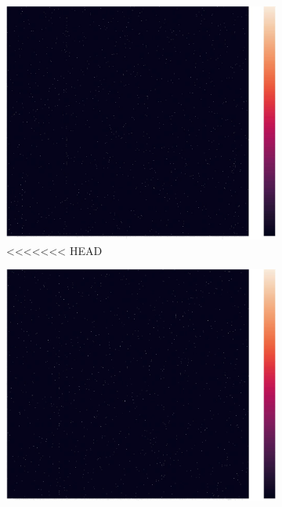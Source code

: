 \documentclass[12pt,%
               a4paper,%
               oneside,openany,%
               titlepage,%
               headinclude,footinclude,%
               BCOR5mm,%
               cleardoublepage=empty,%
               tablecaptionabove,%
               floatperchapter,
               ]{scrreprt}                 %
\begin{document}
\begin{figure}[ht]
\begin{minipage}[b]{0.5\linewidth}
\begin{figure}[ht]
\begin{minipage}[b]{0.5\linewidth}
    \centering
    \includegraphics[width=.9\linewidth]{Figures/Matrix_delta.jpg}
    \vspace{4ex}
<<<<<<< HEAD
  \end{minipage}
\begin{minipage}[b]{0.5\linewidth}
    \centering
    \includegraphics[width=.9\linewidth]{Figures/Matrix_vaccine.jpg}
    \vspace{4ex}
  \end{minipage}
\begin{minipage}[b]{0.5\linewidth}
    \centering

\end{minipage}
\end{figure}
\end{minipage}
\end{figure}
\end{document}
